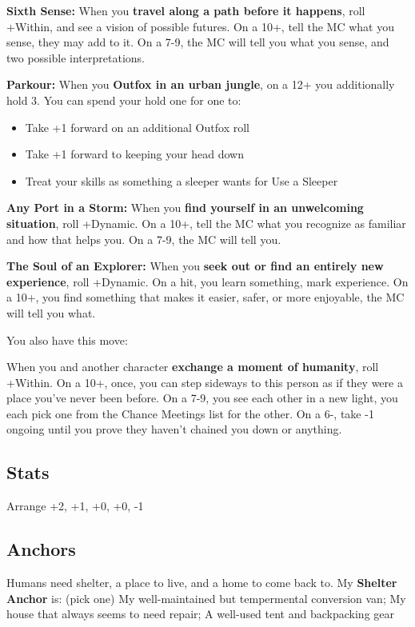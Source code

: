 \documentclass[10pt,twoside,openright]{memoir}
\begin{document}
\textbf{Sixth Sense:} When you \textbf{travel along a path before it
happens}, roll +Within, and see a vision of possible futures. On a 10+,
tell the MC what you sense, they may add to it. On a 7-9, the MC will
tell you what you sense, and two possible interpretations.

\textbf{Parkour:} When you \textbf{Outfox in an urban jungle}, on a 12+
you additionally hold 3. You can spend your hold one for one to:

\begin{itemize}
\tightlist
\item
  Take +1 forward on an additional Outfox roll
\item
  Take +1 forward to keeping your head down
\item
  Treat your skills as something a sleeper wants for Use a Sleeper
\end{itemize}

\textbf{Any Port in a Storm:} When you \textbf{find yourself in an
unwelcoming situation}, roll +Dynamic. On a 10+, tell the MC what you
recognize as familiar and how that helps you. On a 7-9, the MC will tell
you.

\textbf{The Soul of an Explorer:} When you \textbf{seek out or find an
entirely new experience}, roll +Dynamic. On a hit, you learn something,
mark experience. On a 10+, you find something that makes it easier,
safer, or more enjoyable, the MC will tell you what.

You also have this move:

When you and another character \textbf{exchange a moment of humanity},
roll +Within. On a 10+, once, you can step sideways to this person as if
they were a place you've never been before. On a 7-9, you see each other
in a new light, you each pick one from the Chance Meetings list for the
other. On a 6-, take -1 ongoing until you prove they haven't chained you
down or anything.

\hypertarget{stats-9}{%
\subsection{Stats}\label{stats-9}}

Arrange +2, +1, +0, +0, -1

\hypertarget{anchors-8}{%
\subsection{Anchors}\label{anchors-8}}

Humans need shelter, a place to live, and a home to come back to. My
\textbf{Shelter Anchor} is: (pick one) My well-maintained but
tempermental conversion van; My house that always seems to need repair;
A well-used tent and backpacking gear
\end{document}
